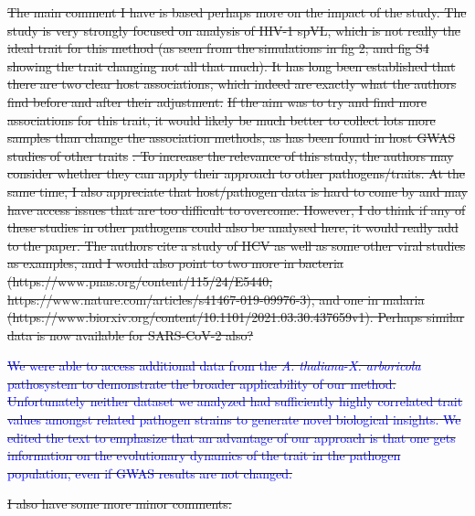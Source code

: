 \documentclass[12pt]{article} %
\providecommand{\DIFdel}[1]{{\protect\color{red}\sout{#1}}}                      %
\begin{document}
\DIFdel{The main comment I have is based perhaps more on the impact of the study. The study is very strongly focused on analysis of HIV-1 spVL, which is not really the ideal trait for this method (as seen from the simulations in fig 2; and fig S4 showing the trait changing not all that much). It has long been established that there are two clear host associations, which indeed are exactly what the authors find before and after their adjustment. }%
\DIFdel{If the aim was to try and find more associations for this trait, it would likely be much better to collect lots more samples than change the association methods, as has been found in host GWAS studies of other traits}%
\DIFdel{. To increase the relevance of this study, the authors may consider whether they can apply their approach to other pathogens/traits. At the same time, I also appreciate that host/pathogen data is hard to come by and may have access issues that are too difficult to overcome. However, I do think if any of these studies in other pathogens could also be analysed here, it would really add to the paper. The authors cite a study of HCV as well as some other viral studies as examples, and I would also point to two more in bacteria (https://www.pnas.org/content/115/24/E5440; https://www.nature.com/articles/s41467-019-09976-3), and one in malaria (https://www.biorxiv.org/content/10.1101/2021.03.30.437659v1). Perhaps similar data is now available for SARS-CoV-2 also?
}%

\DIFdel{\textcolor{blue}{We were able to access additional data from the \emph{A. thaliana}-\emph{X. arboricola} pathosystem to demonstrate the broader applicability of our method. Unfortunately neither dataset we analyzed had sufficiently highly correlated trait values amongst related pathogen strains to generate novel biological insights. We edited the text to emphasize that an advantage of our approach is that one gets information on the evolutionary dynamics of the trait in  the pathogen population, even if GWAS results are not changed.}
}%

\DIFdel{I also have some more minor comments:
}%
\end{document}
